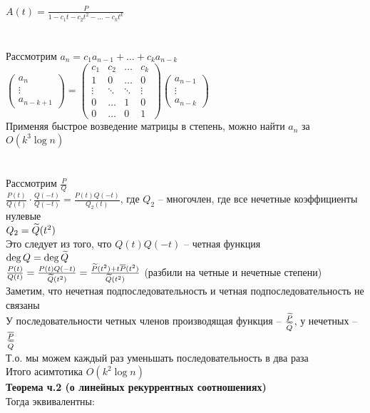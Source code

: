 \documentclass[12pt]{article}
\begin{document}
$A(t) = \frac{P}{1-c_1t-c_2t^2 - \ldots - c_kt^k}$\\\\\\
Рассмотрим $a_n = c_1a_{n-1} + \ldots + c_ka_{n-k}$\\
$\begin{pmatrix}
    a_n\\\vdots\\a_{n-k+1}
\end{pmatrix} = \begin{pmatrix}
    c_1 & c_2 & \ldots & c_k\\
    1 & 0 & \ldots & 0\\
    \vdots & \ddots & \ddots & \vdots\\
    0 & \ldots & 1 & 0\\
    0 & \ldots & 0 & 1
\end{pmatrix}\begin{pmatrix}
    a_{n-1}\\\vdots\\a_{n-k}
\end{pmatrix}$\\
Применяя быстрое возведение матрицы в степень, можно найти $a_n$ за $O(k^3\log n)$\\\\\\
Рассмотрим $\frac{P}{Q}$\\
$\frac{P(t)}{Q(t)} \cdot \frac{Q(-t)}{Q(-t)} = \frac{P(t)Q(-t)}{Q_2(t)}$, где $Q_2$ -- многочлен, где все нечетные коэффициенты нулевые\\
$Q_2 = \widetilde Q(t^2)$\\
Это следует из того, что $Q(t)Q(-t)$ -- четная функция\\
$\deg Q = \deg \widetilde Q$\\
$\frac{P(t)}{Q(t)} = \frac{P(t)Q(-t)}{\widetilde Q(t^2)} = \frac{\widetilde P(t^2) + t\overline P(t^2)}{\widetilde Q(t^2)}$ (разбили на четные и нечетные степени)\\
Заметим, что нечетная подпоследовательность и четная подпоследовательность не связаны\\
У последовательности четных членов производящая функция -- $\frac{\widetilde P}{\widetilde Q}$, у нечетных -- $\frac{\overline P}{\widetilde Q}$\\
Т.о. мы можем каждый раз уменьшать последовательность в два раза\\
Итого асимтотика $O(k^2\log n)$\\
\textbf{Теорема ч.2 (о линейных рекуррентных соотношениях)}\\
Тогда эквивалентны:
\end{document}
